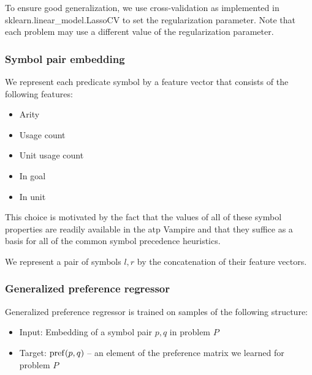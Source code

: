 To ensure good generalization,
we use cross-validation as implemented in sklearn.linear\_model.LassoCV \cite{?}
to set the regularization parameter.
Note that each problem may use a different value of the regularization parameter.

\subsubsection{Symbol pair embedding}

We represent each predicate symbol by a feature vector that consists of the following features:

\begin{itemize}
	\item Arity
	\item Usage count
	\item Unit usage count
	\item In goal
	\item In unit
\end{itemize}

This choice is motivated by the fact that the values of all of these symbol properties
are readily available in the \gls{atp} Vampire
and that they suffice as a basis for all of the common symbol precedence heuristics.

We represent a pair of symbols \(l, r\) by the concatenation of their feature vectors.

\subsubsection{Generalized preference regressor}

Generalized preference regressor is trained on samples of the following structure:

\begin{itemize}
	\item Input: Embedding of a symbol pair \(p, q\) in problem \(P\)
	\item Target: \(\operatorname{pref}(p, q)\) -- an element of the preference matrix we learned for problem \(P\)
\end{itemize}

